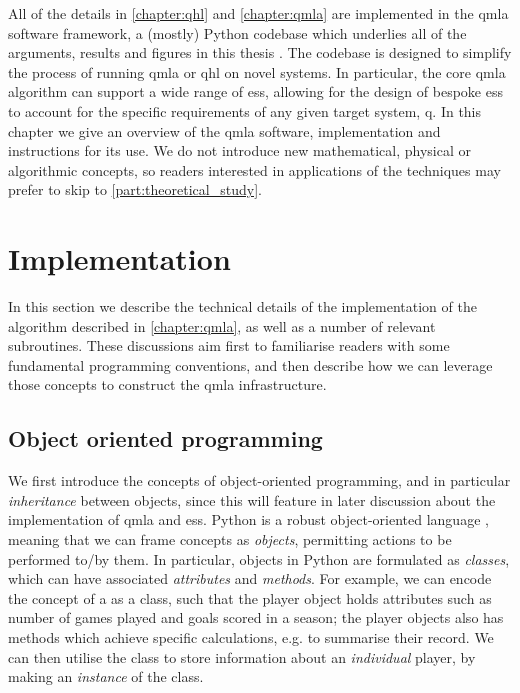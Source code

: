 

All of the details in \cref{chapter:qhl} and \cref{chapter:qmla} are implemented in the \gls{qmla}
    software framework, a (mostly) Python codebase which underlies all of the 
    arguments, results and figures in this thesis \cite{flynn2021QMLA}. 
The codebase is designed to simplify the process of running \gls{qmla} or \gls{qhl}
    on novel systems.
In particular, the core \gls{qmla} algorithm can support a wide range of \glspl{es}, 
    allowing for the design of bespoke \glspl{es} to account for the specific requirements 
    of any given target system, \gls{q}. 
In this chapter we give an overview of the \gls{qmla} software, 
    implementation and instructions for its use. 
We do not introduce new mathematical, physical or algorithmic concepts, 
    so readers interested in applications of the techniques may prefer to skip to \cref{part:theoretical_study}.

\section{Implementation}
In this section we describe the technical details of the implementation of the 
    algorithm described in \cref{chapter:qmla}, as well as a number of relevant subroutines. 
These discussions aim first to familiarise readers with some fundamental programming conventions,
    and then describe how we can leverage those concepts to construct the \gls{qmla} infrastructure.

\subsection{Object oriented programming}
We first introduce the concepts of object-oriented programming, 
    and in particular \emph{inheritance} between objects, 
    since this will feature in later discussion about the implementation of \gls{qmla}
    and \glspl{es}. 
Python is a robust object-oriented language \cite{python-manual}, meaning that we can frame 
    concepts as \emph{objects}, permitting actions to be performed to/by them. 
In particular, objects in Python are formulated as \emph{classes}, 
    which can have associated \emph{attributes} and \emph{methods}. 
For example, we can encode the concept of a  as a class,
    such that the player object holds attributes such as number of games played and goals scored in a season;
    the player objects also has methods which achieve specific calculations, 
    e.g. to summarise their record.
We can then utilise the  class to store information about an \emph{individual} player, 
    by making an \emph{instance} of the class.
\par 

